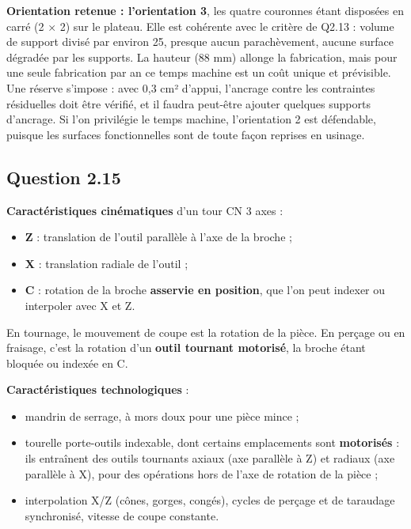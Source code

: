 \documentclass[11pt,a4paper]{article}
\providecommand{\tightlist}{\setlength{\itemsep}{0pt}\setlength{\parskip}{0pt}}
\begin{document}
\textbf{Orientation retenue : l'orientation 3}, les quatre couronnes étant disposées en carré (2 × 2) sur le plateau. Elle est cohérente avec le critère de Q2.13 : volume de support divisé par environ 25, presque aucun parachèvement, aucune surface dégradée par les supports. La hauteur (88 mm) allonge la fabrication, mais pour une seule fabrication par an ce temps machine est un coût unique et prévisible. Une réserve s'impose : avec 0,3 cm² d'appui, l'ancrage contre les contraintes résiduelles doit être vérifié, et il faudra peut-être ajouter quelques supports d'ancrage. Si l'on privilégie le temps machine, l'orientation 2 est défendable, puisque les surfaces fonctionnelles sont de toute façon reprises en usinage.

\hypertarget{question-2.15}{%
\subsection{Question 2.15}\label{question-2.15}}

\textbf{Caractéristiques cinématiques} d'un tour CN 3 axes :

\begin{itemize}
\tightlist
\item
  \textbf{Z} : translation de l'outil parallèle à l'axe de la broche ;
\item
  \textbf{X} : translation radiale de l'outil ;
\item
  \textbf{C} : rotation de la broche \textbf{asservie en position}, que l'on peut indexer ou interpoler avec X et Z.
\end{itemize}

En tournage, le mouvement de coupe est la rotation de la pièce. En perçage ou en fraisage, c'est la rotation d'un \textbf{outil tournant motorisé}, la broche étant bloquée ou indexée en C.

\textbf{Caractéristiques technologiques} :

\begin{itemize}
\tightlist
\item
  mandrin de serrage, à mors doux pour une pièce mince ;
\item
  tourelle porte-outils indexable, dont certains emplacements sont \textbf{motorisés} : ils entraînent des outils tournants axiaux (axe parallèle à Z) et radiaux (axe parallèle à X), pour des opérations hors de l'axe de rotation de la pièce ;
\item
  interpolation X/Z (cônes, gorges, congés), cycles de perçage et de taraudage synchronisé, vitesse de coupe constante.
\end{itemize}
\end{document}

